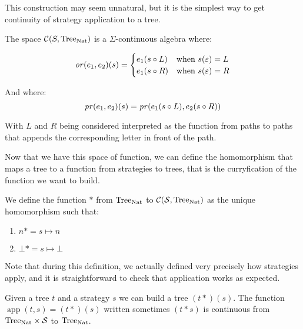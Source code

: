 This construction may seem unnatural, but it is the simplest 
way to get continuity of strategy application to a tree.

\begin{definition}
    The space $\mathcal{C}(S,\textnormal{Tree}_{\textnormal{Nat}})$ is a $\Sigma$-continuous 
    algebra where:

    \begin{equation*}
        \operatorname{\mathit{or}} (e_1,e_2) (s) = 
        \begin{cases}
            e_1 (s \circ L) & \text{when } s(\varepsilon) = L \\
            e_1 (s \circ R) & \text{when } s(\varepsilon) = R 
        \end{cases}
    \end{equation*}

    And where:
    \begin{equation*}
        \operatorname{\mathit{pr}} (e_1,e_2) (s) = \operatorname{\mathit{pr}} (e_1 (s \circ L), e_2 (s \circ R)) 
    \end{equation*}

    With $L$ and $R$ being considered interpreted as the function 
    from paths to paths that appends the corresponding letter in front of 
    the path.
\end{definition}

Now that we have this space of function, we can define the 
homomorphism that maps a tree to a function from strategies 
to trees, that is the curryfication of the function we want to build.

\begin{definition}
    We define the function $*$ from $\textnormal{Tree}_{\textnormal{Nat}}$ to $\mathcal{C}(\mathcal{S},\textnormal{Tree}_{\textnormal{Nat}})$
    as the unique homomorphism such that:

    \begin{enumerate}
        \item $n* = s \mapsto n$
        \item $\bot* = s \mapsto \bot$
    \end{enumerate}
\end{definition}

Note that during this definition, we actually defined very precisely 
how strategies apply, and it is straightforward to check that 
application works as expected.

\begin{lemma}[Continuity]
    Given a tree $t$ and a strategy $s$ we can 
    build a tree $(t*) (s)$. The function 
    $\operatorname{app}(t,s) = (t*)(s)$ written sometimes
    $(t*s)$ 
    is continuous 
    from $\textnormal{Tree}_{\textnormal{Nat}} \times \mathcal{S}$ to $\textnormal{Tree}_{\textnormal{Nat}}$.
\end{lemma}

